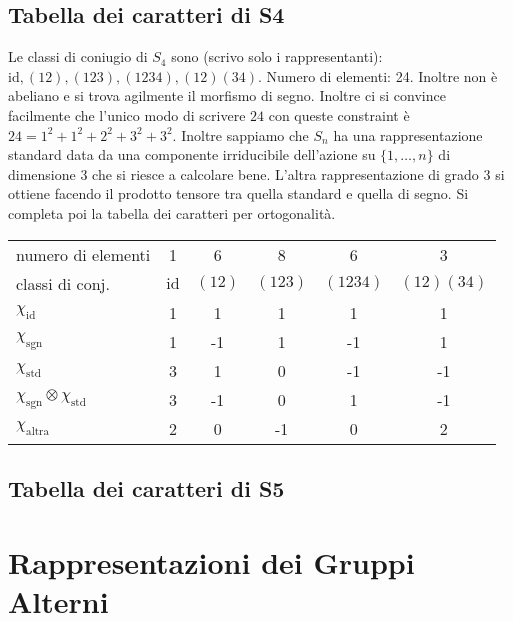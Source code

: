 \documentclass[a4paper,NoNotes,GeneralMath]{stdmdoc}
\begin{document}
	\subsection{Tabella dei caratteri di S4}
	Le classi di coniugio di $S_4$ sono (scrivo solo i rappresentanti): $\text{id}, (1 2), (1 2 3), (1 2 3 4), (1 2)(3 4)$. Numero di elementi: 24. Inoltre non è abeliano e si trova agilmente il morfismo di segno. Inoltre ci si convince facilmente che l'unico modo di scrivere $24$ con queste constraint è $24 = 1^2 + 1^2 + 2^2 + 3^2 + 3^2$. Inoltre sappiamo che $S_n$ ha una rappresentazione standard data da una componente irriducibile dell'azione su $\{1, \ldots, n\}$ di dimensione $3$ che si riesce a calcolare bene. L'altra rappresentazione di grado $3$ si ottiene facendo il prodotto tensore tra quella standard e quella di segno. Si completa poi la tabella dei caratteri per ortogonalità.
	\begin{center} \begin{tabular}{lccccc}
	numero di elementi & 1    & 6    & 8    & 6   & 3   \\
	classi di conj.    & $\text{id}$ & $(1 2)$ & $(1 2 3)$ & $(1 2 3 4)$ & $(1 2)(3 4)$ \\ \hline
	$\chi_\text{id}$   & 1    & 1    & 1    & 1   & 1   \\
	$\chi_\text{sgn}$  & 1    & -1   & 1    & -1  & 1   \\
	$\chi_\text{std}$  & 3    & 1    & 0    & -1  & -1  \\
	$\chi_\text{sgn} \otimes \chi_\text{std}$ & 3   & -1  & 0   & 1    & -1  \\
	$\chi_\text{altra}$ & 2   & 0    & -1   & 0   & 2   \\
	\end{tabular} \end{center} \vskip 0.5cm
	
	\subsection{Tabella dei caratteri di S5}

	\section{Rappresentazioni dei Gruppi Alterni}
\end{document}
